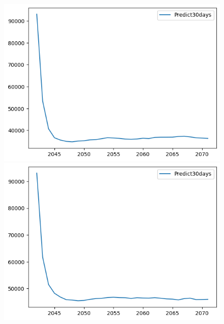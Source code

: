\begin{figure}[H]
\begin{minipage}{0.15\textwidth}
    \includegraphics[width=1\textwidth]{resources/chapter-5/predicted/KF_VCB_8_2_30days.png}
    \end{minipage}
    \hfill
        \begin{minipage}{0.15\textwidth}
    \centering
    \includegraphics[width=1\textwidth]{resources/chapter-5/predicted/KF_VCB_9_1_30days.png}
    \end{minipage}
    \hfill
    \begin{minipage}{0.15\textwidth}
    \centering

\end{minipage}
\end{figure}
